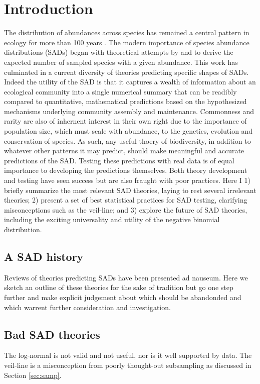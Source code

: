\documentclass[12pt]{article}
\begin{document}
\section{Introduction}

The distribution of abundances across species has remained a central
pattern in ecology for more than 100 years
\citep{RaunkaierLawFrequence}. The modern importance of species
abundance distributions (SADs) began with theoretical attempts by
\cite{fisher} and \cite{preston} to derive the expected number of
sampled species with a given abundance. This work has culminated in a
current diversity of theories predicting specific shapes of
SADs. Indeed the utility of the SAD is that it captures a wealth of
information about an ecological community into a single numerical
summary that can be readibly compared to quantitative, mathematical
predictions based on the hypothesized mechanisms underlying community
assembly and maintenance.  Commonness and rarity are also of inhernent
interest in their own right due to the importance of population size,
which must scale with abundance, to the genetics, evolution and
conservation of species. As such, any useful thoery of biodiversity,
in addition to whatever other patterns it may predict, should make
meaningful and accurate predictions of the SAD. Testing these
predictions with real data is of equal importance to developing the
predictions themselves.  Both theory development and testing have seen
success \citep{} but are also fraught with poor practices. Here I 1)
briefly summarize \citep[not needing to re-invent more detailed
reviews][]{stuff} the most relevant SAD theories, laying to rest
several irrelevant theories; 2) present a set of best statistical
practices for SAD testing, clarifying misconceptions such as the
veil-line; and 3) explore the future of SAD theories, including the
exciting universality and utility of the negative binomial
distribution.

\subsection{A SAD history}
Reviews of theories predicting SADs have been presented ad
nauseum. Here we sketch an outline of these theories for the sake of
tradition but go one step further and make explicit judgement about
which should be abandonded and which warrent further consideration and
investigation.

\subsection{Bad SAD theories}
The log-normal is not valid and not useful, nor is it well supported
by data. The veil-line is a misconception from poorly thought-out
subsampling as discussed in Section \ref{sec:samp}.
\end{document}
